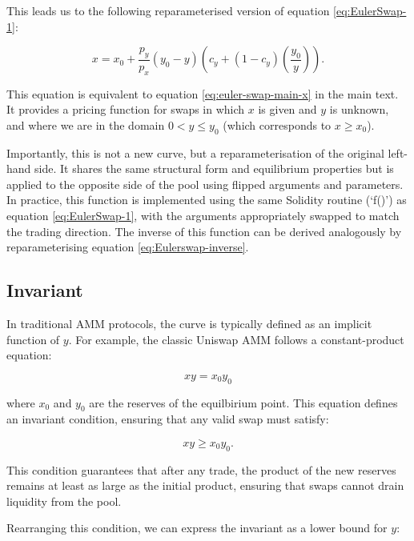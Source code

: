 \documentclass{article}
\begin{document}
This leads us to the following reparameterised version of equation \eqref{eq:EulerSwap-1}:

\begin{equation}
\label{eq:EulerSwap-2}
x = x_0 + \frac{p_y}{p_x} (y_0 - y) \left( c_y + (1 - c_y) \left(\frac{y_0}{y}\right) \right).
\end{equation}

This equation is equivalent to equation \eqref{eq:euler-swap-main-x} in the main text. It provides a pricing function for swaps in which $x$ is given and $y$ is unknown, and where we are in the domain $0 < y \leq y_0$ (which corresponds to $x \geq x_0$).

Importantly, this is not a new curve, but a reparameterisation of the original left-hand side. It shares the same structural form and equilibrium properties but is applied to the opposite side of the pool using flipped arguments and parameters. In practice, this function is implemented using the same Solidity routine (`f()') as equation \eqref{eq:EulerSwap-1}, with the arguments appropriately swapped to match the trading direction. The inverse of this function can be derived analogously by reparameterising equation \eqref{eq:Eulerswap-inverse}.

\subsection{Invariant}
\label{sec:invariant}

In traditional AMM protocols, the curve is typically defined as an implicit function of $y$. For example, the classic Uniswap AMM follows a constant-product equation:

\begin{equation}
    xy = x_0 y_0
\end{equation}

where $x_0$ and $y_0$ are the reserves of the equilbirium point. This equation defines an invariant condition, ensuring that any valid swap must satisfy:

\begin{equation}
    xy \geq x_0 y_0.
\end{equation}

This condition guarantees that after any trade, the product of the new reserves remains at least as large as the initial product, ensuring that swaps cannot drain liquidity from the pool.

Rearranging this condition, we can express the invariant as a lower bound for $y$:
\end{document}
